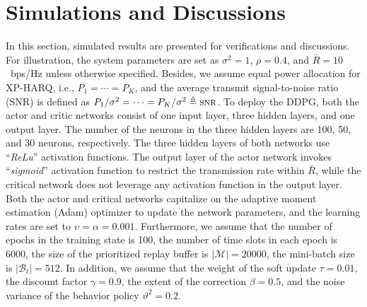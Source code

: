\documentclass[lettersize,journal]{IEEEtran}
\begin{document}
\section{Simulations and Discussions}\label{sec:eva}
In this section, simulated results are presented for verifications and discussions. For illustration, the system parameters are set as $\sigma^{2} = 1$, ${\rho}=0.4$, and ${\bar R}=10 $~bps/Hz unless otherwise specified. Besides, we assume equal power allocation for XP-HARQ, i.e., $P_{1}=\cdots=P_{K}$, and the average transmit signal-to-noise ratio (SNR) is defined as $P_{1} / \sigma^{2}= \cdots= P_{K} / \sigma^{2} \triangleq { \textsc{snr}}$. %
To deploy the DDPG, both the actor and critic networks consist of one input layer, three hidden layers, and one output layer. The number of the neurons in the three hidden layers are 100, 50, and 30 neurons, respectively. The three hidden layers of both networks use ``{\emph{ReLu}}'' activation functions. The output layer of the actor network invokes ``{\emph{sigmoid}}'' activation function to restrict the transmission rate within $\bar R$, while the critical network does not leverage any activation function in the output layer. %
Both the actor and critical networks capitalize on the adaptive moment estimation (Adam) optimizer to update the network parameters, and the learning rates are set to $\upsilon = \alpha = 0.001$. Furthermore, we assume that the number of epochs in the training state is 100, the  number of time slots in each epoch is 6000, the size of the prioritized replay buffer is $|\mathcal M|=20000$, the mini-batch size is $|\mathcal B_t|=512$. In addition, we assume that the weight of the soft update $\tau=0.01$, the discount factor $\gamma=0.9$, the extent of the correction $\beta=0.5$, and the noise variance of the behavior policy $\vartheta^2 = 0.2$.


\end{document}
